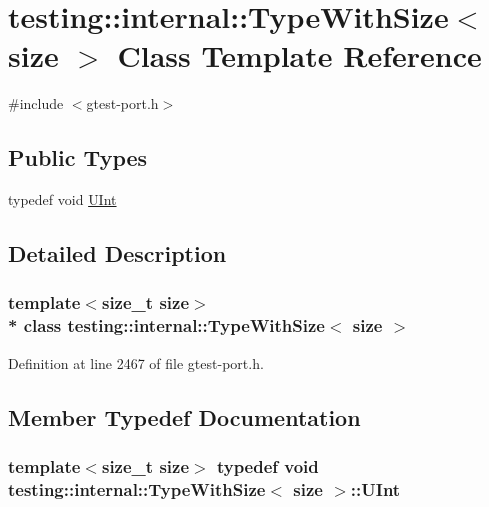 \hypertarget{classtesting_1_1internal_1_1_type_with_size}{}\section{testing\+:\+:internal\+:\+:Type\+With\+Size$<$ size $>$ Class Template Reference}
\label{classtesting_1_1internal_1_1_type_with_size}


{\ttfamily \#include $<$gtest-\/port.\+h$>$}

\subsection*{Public Types}
\begin{DoxyCompactItemize}
\item 
typedef void \hyperlink{classtesting_1_1internal_1_1_type_with_size_a3898640d9f6c1e18110eef90f47a5d7b}{U\+Int}
\end{DoxyCompactItemize}


\subsection{Detailed Description}
\subsubsection*{template$<$size\+\_\+t size$>$\\*
class testing\+::internal\+::\+Type\+With\+Size$<$ size $>$}



Definition at line 2467 of file gtest-\/port.\+h.



\subsection{Member Typedef Documentation}
\subsubsection[{\texorpdfstring{U\+Int}{UInt}}]{\setlength{\rightskip}{0pt plus 5cm}template$<$size\+\_\+t size$>$ typedef void {\bf testing\+::internal\+::\+Type\+With\+Size}$<$ size $>$\+::{\bf U\+Int}}\hypertarget{classtesting_1_1internal_1_1_type_with_size_a3898640d9f6c1e18110eef90f47a5d7b}{}\label{classtesting_1_1internal_1_1_type_with_size_a3898640d9f6c1e18110eef90f47a5d7b}


